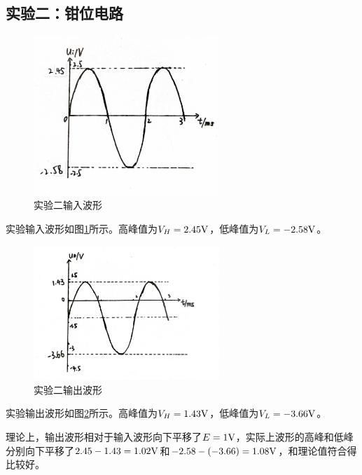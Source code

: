 \documentclass[a4paper,11pt,UTF8]{ctexart}
\begin{document}
\subsection{实验二：钳位电路}
\begin{figure}[H]
 \centering
 \includegraphics[width=7cm]{Exp2i}
 \caption{实验二输入波形}
 \label{fig:Exp2i}
\end{figure}
实验输入波形如图\ref{fig:Exp2i}所示。高峰值为$V_H=2.45\mathrm{V}$，低峰值为$V_L=-2.58\mathrm{V}$。
\begin{figure}[H]
 \centering
 \includegraphics[width=7cm]{Exp2o}
 \caption{实验二输出波形}
 \label{fig:Exp2o}
\end{figure}
实验输出波形如图\ref{fig:Exp2o}所示。高峰值为$V_H=1.43\mathrm{V}$，低峰值为$V_L=-3.66\mathrm{V}$。
\par 理论上，输出波形相对于输入波形向下平移了$E=1\mathrm{V}$，实际上波形的高峰和低峰分别向下平移了$2.45-1.43=1.02\mathrm{V}$和$-2.58-(-3.66)=1.08\mathrm{V}$，和理论值符合得比较好。
\end{document}
